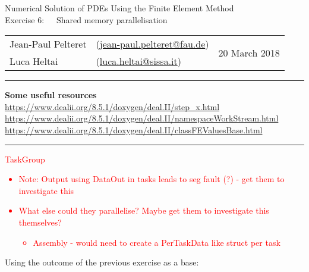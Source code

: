 \documentclass[11pt,answers]{exam}
\makeatletter
\newcommand{\makeheader}[3]{%
\setcounter{question}{0}
\begin{center}
{\sc Numerical Solution of PDEs Using the Finite Element Method}\vspace{2ex}\\
{\sc Exercise #1:\ \ \ #2}\vspace{2ex}\\
\begin{tabular*}{\textwidth}{ll @{\extracolsep{\fill}}r}
Jean-Paul Pelteret & (\url{jean-paul.pelteret@fau.de}) & \multirow{2}{*}{#3} \\
Luca Heltai & (\url{luca.heltai@sissa.it}) & \\
\end{tabular*}
\end{center}
}
\newcommand{\makeresources}[1]{%
\rule{\textwidth}{0.6mm}
\textbf{Some useful resources}\\[1.5ex]
#1 \par
\rule{\textwidth}{0.6mm}
}
\newcommand{\FINISHME}[1]{\textcolor{red}{#1}}
\makeatother
\begin{document}
\begin{questions}
\end{questions}




\clearpage
\makeheader{6}{Shared memory parallelisation}{20 March 2018}
\makeresources{%
\url{https://www.dealii.org/8.5.1/doxygen/deal.II/step_x.html} \\
\url{https://www.dealii.org/8.5.1/doxygen/deal.II/namespaceWorkStream.html} \\
\url{https://www.dealii.org/8.5.1/doxygen/deal.II/classFEValuesBase.html}
}

\begin{questions}

\question \FINISHME{TaskGroup
\begin{itemize}
\item Note: Output using DataOut in tasks leads to seg fault (?) - get them to investigate this
\item What else could they parallelise? Maybe get them to investigate this themselves?
\begin{itemize}
\item Assembly - would need to create a PerTaskData like struct per task
\end{itemize}
\end{itemize}
}

\question Using the outcome of the previous exercise as a base:



\end{questions}
\end{document}
